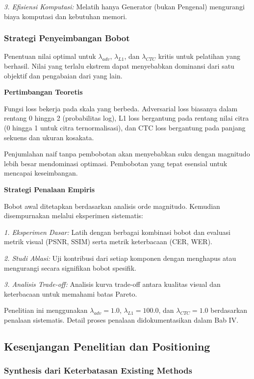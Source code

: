 \documentclass[12pt,a4paper]{article}
\begin{document}
\textit{3. Efisiensi Komputasi:} Melatih hanya Generator (bukan Pengenal) mengurangi biaya komputasi dan kebutuhan memori.

\subsubsection{Strategi Penyeimbangan Bobot}
\label{subsubsec:weight-balancing}

Penentuan nilai optimal untuk $\lambda_{adv}$, $\lambda_{L1}$, dan $\lambda_{CTC}$ kritis untuk pelatihan yang berhasil. Nilai yang terlalu ekstrem dapat menyebabkan dominansi dari satu objektif dan pengabaian dari yang lain.

\textbf{Pertimbangan Teoretis}

Fungsi loss bekerja pada skala yang berbeda. Adversarial loss biasanya dalam rentang 0 hingga 2 (probabilitas log), L1 loss bergantung pada rentang nilai citra (0 hingga 1 untuk citra ternormalisasi), dan CTC loss bergantung pada panjang sekuens dan ukuran kosakata.

Penjumlahan naif tanpa pembobotan akan menyebabkan suku dengan magnitudo lebih besar mendominasi optimasi. Pembobotan yang tepat esensial untuk mencapai keseimbangan.

\textbf{Strategi Penalaan Empiris}

Bobot awal ditetapkan berdasarkan analisis orde magnitudo. Kemudian disempurnakan melalui eksperimen sistematis:

\textit{1. Eksperimen Dasar:} Latih dengan berbagai kombinasi bobot dan evaluasi metrik visual (PSNR, SSIM) serta metrik keterbacaan (CER, WER).

\textit{2. Studi Ablasi:} Uji kontribusi dari setiap komponen dengan menghapus atau mengurangi secara signifikan bobot spesifik.

\textit{3. Analisis Trade-off:} Analisis kurva trade-off antara kualitas visual dan keterbacaan untuk memahami batas Pareto.

Penelitian ini menggunakan $\lambda_{adv} = 1.0$, $\lambda_{L1} = 100.0$, dan $\lambda_{CTC} = 1.0$ berdasarkan penalaan sistematis. Detail proses penalaan didokumentasikan dalam Bab IV.

\subsection{Kesenjangan Penelitian dan Positioning}
\label{subsec:research-gap}

\subsubsection{Synthesis dari Keterbatasan Existing Methods}
\label{subsubsec:gap-synthesis}
\end{document}
